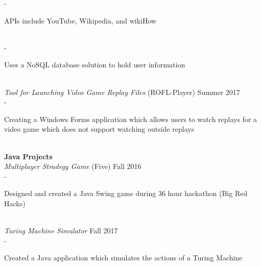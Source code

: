 \documentclass[11pt]{article}
\begin{document}
                \indent\indent\indent - \begin{minipage}{\dimexpr\textwidth-7cm}
                    \small{ APIs include YouTube, Wikipedia, and wikiHow}
                \end{minipage}\vspace{0.2mm}\\
                \indent\indent\indent - \begin{minipage}{\dimexpr\textwidth-7cm}
                    \small{ Uses a NoSQL database solution to hold user information}
                \end{minipage}\vspace{0.2mm}\\
            \indent\indent \small\textit{Tool for Launching Video Game Replay Files}\small{ (ROFL-Player)} \hfill \small{Summer 2017}\indent\vspace{0.5mm}\\
                \indent\indent\indent - \begin{minipage}{\dimexpr\textwidth-7cm}
                    \small{ Creating a Windows Forms application which allows users to watch replays for a video game which does not support watching outside replays}
                \end{minipage}\vspace{1mm}\\
        \indent \small\textbf{Java Projects}\\
            \indent\indent \small\textit{Multiplayer Stradegy Game}\small{ (Five)} \hfill \small{Fall 2016}\indent\vspace{0.5mm}\\
                \indent\indent\indent - \begin{minipage}{\dimexpr\textwidth-7cm}
                    \small{ Designed and created a Java Swing game during 36 hour hackathon (Big Red Hacks)}
                \end{minipage}\vspace{1mm}\\
            \indent\indent \small\textit{Turing Machine Simulator} \hfill \small{Fall 2017}\indent\\
                \indent\indent\indent - \begin{minipage}{\dimexpr\textwidth-7cm}
                    \small{ Created a Java application which simulates the actions of a Turing Machine}
                \end{minipage}\vspace{1mm}\\
\end{document}

